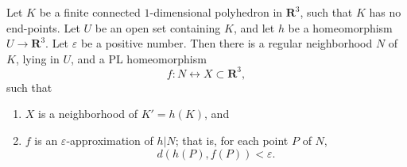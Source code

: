 Let $K$ be a finite connected $1$-dimensional polyhedron in $\mathbf{R}^3$, such that $K$ has no end-points. Let $U$ be an open set containing $K$, and let $h$ be a homeomorphism $U \to \mathbf{R}^3$. Let $\varepsilon$ be a positive number. Then there is a regular neighborhood $N$ of $K$, lying in $U$, and a PL homeomorphism
$$f: N \leftrightarrow X \subset \mathbf{R}^3,$$
such that
\begin{enumerate}
\item[(1)] $X$ is a neighborhood of $K' = h(K)$, and
\item[(2)] $f$ is an $\varepsilon$-approximation of $h|N$; that is, for each point $P$ of $N$,
$$d(h(P), f(P)) < \varepsilon.$$
\end{enumerate}

